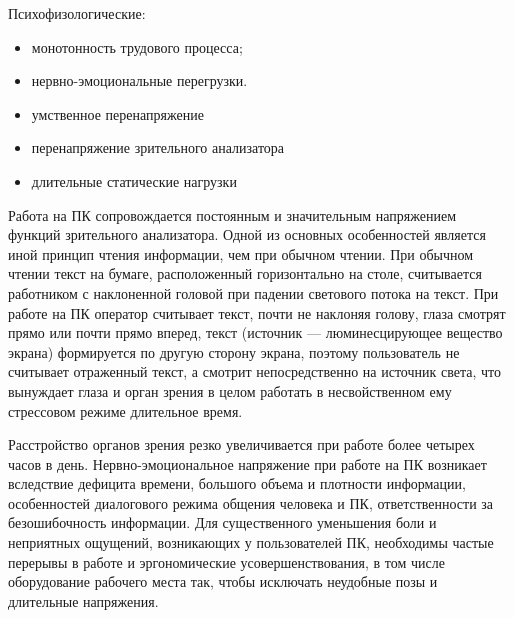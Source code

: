 \noindent Психофизологические:
\begin{itemize}
	\item монотонность трудового процесса;
	\item нервно-эмоциональные перегрузки.
	\item умственное перенапряжение
	\item перенапряжение зрительного анализатора
	\item длительные статические нагрузки
\end{itemize}

Работа на ПК сопровождается постоянным и значительным напряжением функций зрительного анализатора. Одной из основных особенностей является иной принцип чтения информации, чем при обычном чтении. При обычном чтении текст на бумаге, расположенный горизонтально на столе, считывается работником с наклоненной головой при падении светового потока на текст. При работе на ПК оператор считывает текст, почти не наклоняя голову, глаза смотрят прямо или почти прямо вперед, текст (источник — люминесцирующее вещество экрана) формируется по другую сторону экрана, поэтому пользователь не считывает отраженный текст, а смотрит непосредственно на источник света, что вынуждает глаза и орган зрения в целом работать в несвойственном ему стрессовом режиме длительное время.

Расстройство органов зрения резко увеличивается при работе более четырех часов в день. Нервно-эмоциональное напряжение при работе на ПК возникает вследствие дефицита времени, большого объема и плотности информации, особенностей диалогового режима общения человека и ПК, ответственности за безошибочность информации.
Для существенного уменьшения боли и неприятных ощущений, возникающих у пользователей ПК, необходимы частые перерывы в работе и эргономические усовершенствования, в том числе оборудование рабочего места так, чтобы исключать неудобные позы и длительные напряжения.

